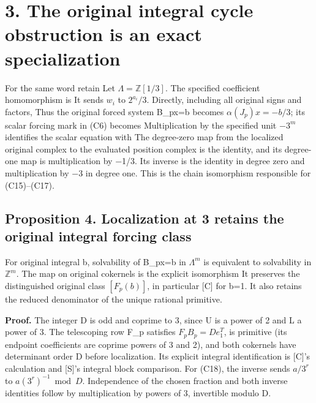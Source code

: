 \section{3. The original integral cycle obstruction is an exact
specialization}

For the same word retain
 Let
\(\Lambda=\mathbb Z[1/3]\). The specified coefficient homomorphism is
It sends \(w_i\) to \(2^{a_i}/3\). Directly, including all original
signs and factors,  Thus the original forced system B\_px=b
becomes \(\alpha(J_p)x=-b/3\); its scalar forcing mark in (C6) becomes
 Multiplication by
the specified unit \(-3^m\) identifies the scalar equation with
 The degree-zero map from the localized
original complex to the evaluated position complex is the identity, and
its degree-one map is multiplication by −1/3. Its inverse is the
identity in degree zero and multiplication by −3 in degree one. This is
the chain isomorphism responsible for (C15)--(C17).

\subsection{Proposition 4. Localization at 3 retains the original
integral forcing class}

For original integral b, solvability of B\_px=b in \(\Lambda^m\) is
equivalent to solvability in \(\mathbb Z^m\). The map on original
cokernels is the explicit isomorphism
It preserves the distinguished original class \([F_p(b)]\), in
particular {[}C{]} for b=1. It also retains the reduced denominator of
the unique rational primitive.

\textbf{Proof.} The integer D is odd and coprime to 3, since U is a
power of 2 and L a power of 3. The telescoping row F\_p satisfies
\(F_pB_p=D e_1^T\), is primitive (its endpoint coefficients are coprime
powers of 3 and 2), and both cokernels have determinant order
\textbar D\textbar{} before localization. Its explicit integral
identification is {[}C{]}'s calculation and {[}S{]}'s integral block
comparison. For (C18), the inverse sends \(a/3^r\) to
\(a(3^r)^{-1}\bmod D\). Independence of the chosen fraction and both
inverse identities follow by multiplication by powers of 3, invertible
modulo D.

